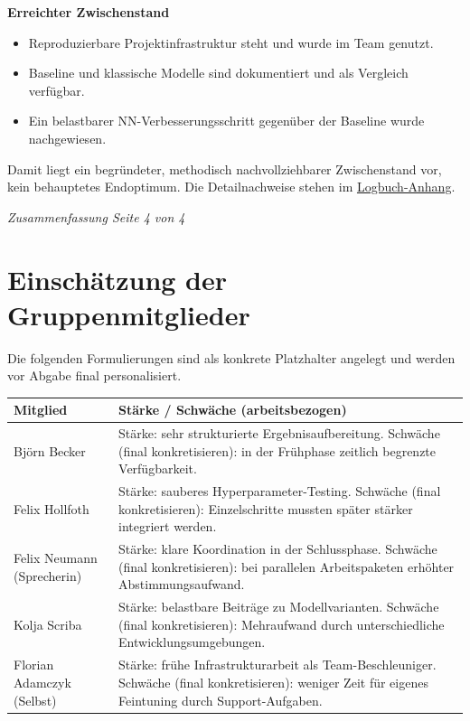 \documentclass[11pt,a4paper,ngerman,openany]{report}
\begin{document}
\textbf{Erreichter Zwischenstand}
\begin{itemize}[leftmargin=*,itemsep=0.15em,topsep=0.15em]
    \item Reproduzierbare Projektinfrastruktur steht und wurde im Team genutzt.
    \item Baseline und klassische Modelle sind dokumentiert und als Vergleich verf\"ugbar.
    \item Ein belastbarer NN-Verbesserungsschritt gegen\"uber der Baseline wurde nachgewiesen.
\end{itemize}

Damit liegt ein begr\"undeter, methodisch nachvollziehbarer Zwischenstand vor, kein behauptetes Endoptimum. Die Detailnachweise stehen im \hyperref[sec:logbuch-anhang]{Logbuch-Anhang}.

\vfill
\begin{flushright}
\textit{Zusammenfassung Seite 4 von 4}
\end{flushright}

\newpage

\section{Einsch\"atzung der Gruppenmitglieder}

Die folgenden Formulierungen sind als konkrete Platzhalter angelegt und werden vor Abgabe final personalisiert.

\small
\begin{tabularx}{\textwidth}{>{\raggedright\arraybackslash}p{3.2cm}X}
\toprule
\textbf{Mitglied} & \textbf{St\"arke / Schw\"ache (arbeitsbezogen)} \\
\midrule
Bj\"orn Becker & St\"arke: sehr strukturierte Ergebnisaufbereitung. Schw\"ache (final konkretisieren): in der Fr\"uhphase zeitlich begrenzte Verf\"ugbarkeit. \\
Felix Hollfoth & St\"arke: sauberes Hyperparameter-Testing. Schw\"ache (final konkretisieren): Einzelschritte mussten sp\"ater st\"arker integriert werden. \\
Felix Neumann (Sprecherin) & St\"arke: klare Koordination in der Schlussphase. Schw\"ache (final konkretisieren): bei parallelen Arbeitspaketen erh\"ohter Abstimmungsaufwand. \\
Kolja Scriba & St\"arke: belastbare Beitr\"age zu Modellvarianten. Schw\"ache (final konkretisieren): Mehraufwand durch unterschiedliche Entwicklungsumgebungen. \\
Florian Adamczyk (Selbst) & St\"arke: fr\"uhe Infrastrukturarbeit als Team-Beschleuniger. Schw\"ache (final konkretisieren): weniger Zeit f\"ur eigenes Feintuning durch Support-Aufgaben. \\
\bottomrule
\end{tabularx}
\normalsize
\end{document}
